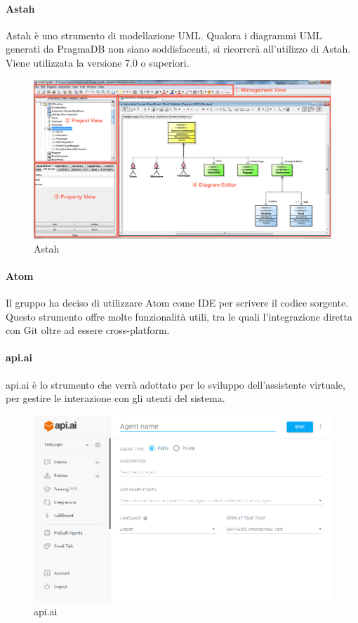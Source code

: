   \paragraph{Astah}
  Astah è uno strumento di modellazione UML. Qualora i diagrammi UML generati da PragmaDB non siano soddisfacenti, si ricorrerà all'utilizzo di Astah. Viene utilizzata la versione 7.0 o superiori.
\begin{figure}[h]
\centering
\includegraphics[scale=0.3]{img/astah.png}
\caption{Astah}\label{sec:Figura1}
\end{figure}

\paragraph{Atom}
Il gruppo ha deciso di utilizzare Atom come IDE per scrivere il codice sorgente. Questo strumento offre molte funzionalità utili, tra le quali l'integrazione diretta con Git oltre ad essere cross-platform.

\paragraph{api.ai}
api.ai è lo strumento che verrà adottato per lo sviluppo dell'assistente virtuale, per gestire le interazione con gli utenti del sistema.
\begin{figure}[h]
\centering
\includegraphics[scale=0.5]{img/api_ai.png}
\caption{api.ai}\label{sec:Figura1}
\end{figure}

\newpage
